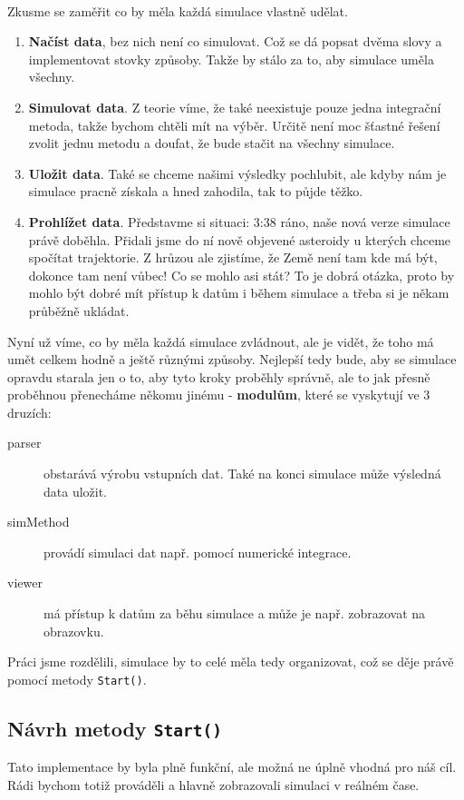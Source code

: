 \paragraph{}
Zkusme se zaměřit co by měla každá simulace vlastně udělat.
\begin{enumerate}
	\item \textbf{Načíst data}, bez nich není co simulovat. Což se dá popsat dvěma slovy a implementovat stovky způsoby. Takže by stálo za to, aby simulace uměla všechny.
	\item \textbf{Simulovat data}. Z teorie víme, že také neexistuje pouze jedna integrační metoda, takže bychom chtěli mít na výběr. Určitě není moc šťastné řešení zvolit jednu metodu a doufat, že bude stačit na všechny simulace.
	\item \textbf{Uložit data}. Také se chceme našimi výsledky pochlubit, ale kdyby nám je simulace pracně získala a hned zahodila, tak to půjde těžko.
	\item \textbf{Prohlížet data}. Představme si situaci: 3:38 ráno, naše nová verze simulace právě doběhla. Přidali jsme do ní nově objevené asteroidy u kterých chceme spočítat trajektorie. Z hrůzou ale zjistíme, že Země není tam kde má být, dokonce tam není vůbec! Co se mohlo asi stát? To je dobrá otázka, proto by mohlo být dobré mít přístup k datům i během simulace a třeba si je někam průběžně ukládat.
\end{enumerate}
Nyní už víme, co by měla každá simulace zvládnout, ale je vidět, že toho má umět celkem hodně a ještě různými způsoby. Nejlepší tedy bude, aby se simulace opravdu starala jen o to, aby tyto kroky proběhly správně, ale to jak přesně proběhnou přenecháme někomu jinému -\textbf{ modulům}, které se vyskytují ve 3 druzích:
\begin{description}
	\item[parser] obstarává výrobu vstupních dat. Také na konci simulace může výsledná data uložit.
	\item[simMethod]  provádí simulaci dat např. pomocí numerické integrace.
	\item[viewer]   má přístup k datům za běhu simulace a může je např. zobrazovat na obrazovku.
\end{description}
Práci jsme rozdělili, simulace by to celé měla tedy organizovat, což se děje právě pomocí metody \texttt{Start()}.
\subsection{Návrh metody \texttt{Start()}}
Tato implementace by byla plně funkční, ale možná ne úplně vhodná pro náš cíl. Rádi bychom totiž prováděli a hlavně zobrazovali simulaci v reálném čase. 

